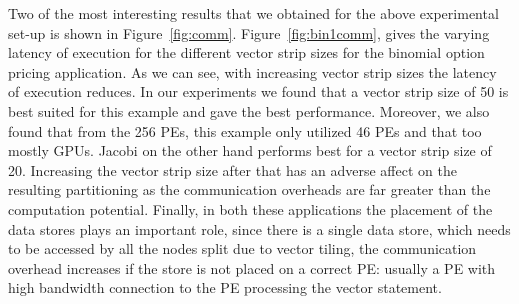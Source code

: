 Two of the most interesting results that we obtained for the above
experimental set-up is shown in
Figure~\ref{fig:comm}. Figure~\ref{fig:bin1comm}, gives the varying
latency of execution for the different vector strip sizes for the
binomial option pricing application. As we can see, with increasing
vector strip sizes the latency of execution reduces. In our experiments
we found that a vector strip size of 50 is best suited for this example
and gave the best performance. Moreover, we also found that from the 256
PEs, this example only utilized 46 PEs and that too mostly GPUs.  Jacobi
on the other hand performs best for a vector strip size of
20. Increasing the vector strip size after that has an adverse affect on
the resulting partitioning as the communication overheads are far
greater than the computation potential. Finally, in both these
applications the placement of the data stores plays an important role,
since there is a single data store, which needs to be accessed by all
the nodes split due to vector tiling, the communication overhead
increases if the store is not placed on a correct PE: usually a PE with
high bandwidth connection to the PE processing the vector statement.

